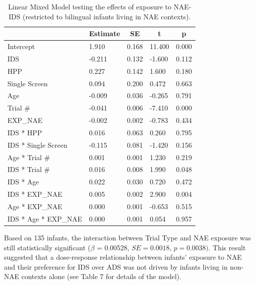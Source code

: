 \documentclass[english,,man,floatsintext]{apa6}
\begin{document}
\begin{table}[tbp]

\begin{center}
\begin{threeparttable}

\caption{\label{tab:unnamed-chunk-13}Linear Mixed Model testing the effects of exposure to NAE-IDS (restricted to bilingual infants living in NAE contexts).}

\begin{tabular}{lllll}
\toprule
 & \multicolumn{1}{c}{Estimate} & \multicolumn{1}{c}{SE} & \multicolumn{1}{c}{t} & \multicolumn{1}{c}{p}\\
\midrule
Intercept & 1.910 & 0.168 & 11.400 & 0.000\\
IDS & -0.211 & 0.132 & -1.600 & 0.112\\
HPP & 0.227 & 0.142 & 1.600 & 0.180\\
Single Screen & 0.094 & 0.200 & 0.472 & 0.663\\
Age & -0.009 & 0.036 & -0.265 & 0.791\\
Trial \# & -0.041 & 0.006 & -7.410 & 0.000\\
EXP\_NAE & -0.002 & 0.002 & -0.783 & 0.434\\
IDS * HPP & 0.016 & 0.063 & 0.260 & 0.795\\
IDS * Single Screen & -0.115 & 0.081 & -1.420 & 0.156\\
Age * Trial \# & 0.001 & 0.001 & 1.230 & 0.219\\
IDS * Trial \# & 0.016 & 0.008 & 1.990 & 0.048\\
IDS * Age & 0.022 & 0.030 & 0.720 & 0.472\\
IDS * EXP\_NAE & 0.005 & 0.002 & 2.900 & 0.004\\
Age * EXP\_NAE & 0.000 & 0.001 & -0.653 & 0.515\\
IDS * Age * EXP\_NAE & 0.000 & 0.001 & 0.054 & 0.957\\
\bottomrule
\end{tabular}

\end{threeparttable}
\end{center}

\end{table}

Based on 135 infants, the interaction between Trial Type and NAE exposure was still statistically significant (\(\beta\) = 0.00528, \(SE = 0.0018\), \(p = 0.0038)\). This result suggested that a dose-response relationship between infants' exposure to NAE and their preference for IDS over ADS was not driven by infants living in non-NAE contexts alone (see Table 7 for details of the model).
\end{document}
